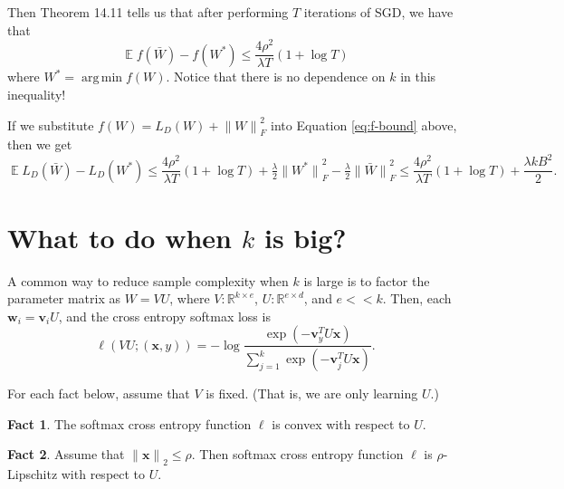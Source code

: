 \documentclass[10pt]{article}
\theoremstyle{definition}
\newtheorem{fact}{Fact}
\newcommand{\R}{\mathbb R}
\DeclareMathOperator{\E}{\mathbb E}
\DeclareMathOperator*{\argmin}{arg\,min}
\newcommand{\trans}[1]{{#1}^{T}}
\newcommand{\loss}{\ell}
\newcommand{\vv}{\mathbf v}
\newcommand{\w}{\mathbf w}
\newcommand{\x}{\mathbf x}
\newcommand{\ltwo}[1]{{\lVert {#1} \rVert}_2}
\newcommand{\lF}[1]{{\lVert {#1} \rVert}_F}
\begin{document}
\vspace{3in}
\noindent
Then Theorem 14.11 tells us that after performing $T$ iterations of SGD, we have that
\begin{equation}
    \label{eq:f-bound}
    \E f(\bar W) - f(W^*) \le \frac{4\rho^2}{\lambda T} ( 1 + \log T)
\end{equation}
where $W^* = \argmin f(W)$.
Notice that there is no dependence on $k$ in this inequality!

If we substitute $f(W)=L_D(W)+\lF{W}^2$ into Equation \ref{eq:f-bound} above,
then we get
\begin{equation}
    \label{eq:f-bound}
    \E L_D(\bar W) - L_D(W^*) 
    \le \frac{4\rho^2}{\lambda T} ( 1 + \log T) + \tfrac\lambda2\lF{W^*}^2 - \tfrac\lambda2\lF{\bar W}^2
    \le \frac{4\rho^2}{\lambda T} ( 1 + \log T) + \frac{\lambda k B^2}{2}
    .
\end{equation}

\newpage
\section{What to do when $k$ is big?}

A common way to reduce sample complexity when $k$ is large is to factor the parameter matrix as $W = VU$,
where $V : \R ^ {k \times e}$, $U : \R^{e \times d}$, and $e<\!<\!k$.
Then, each $\w_i = \vv_i U$, and the cross entropy softmax loss is
\begin{equation}
    \ell(VU;(\x,y)) = - \log \frac {\exp(-\trans\vv_y U \x)}{\sum_{j=1}^k \exp(-\trans \vv_j U \x)}
    .
\end{equation}


\noindent
For each fact below, assume that $V$ is fixed.
(That is, we are only learning $U$.)

\begin{fact}
    The softmax cross entropy function $\loss$ is convex with respect to $U$.
\end{fact}

\begin{fact}
    Assume that $\ltwo{\x}\le \rho$.
    Then softmax cross entropy function $\loss$ is $\rho$-Lipschitz with respect to $U$.
\end{fact}
\end{document}
